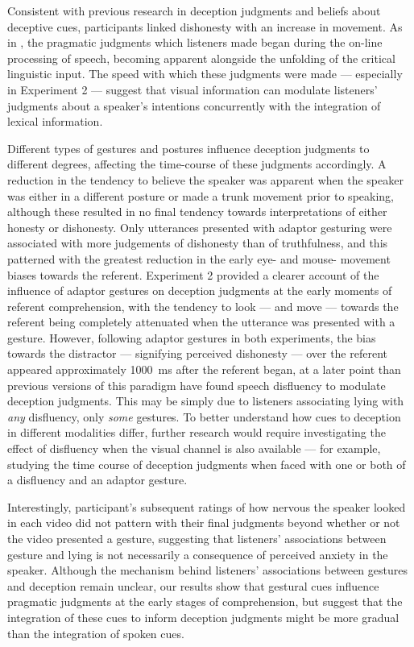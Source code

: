 \documentclass[a4paper,man,natbib]{apa6}
\begin{document}
Consistent with previous research in deception judgments and beliefs about deceptive cues, participants linked dishonesty with an increase in movement. 
As in \citet{Loy2017}, the pragmatic judgments which listeners made began during the on-line processing of speech, becoming apparent alongside the unfolding of the critical linguistic input.
The speed with which these judgments were made --- especially in Experiment 2 --- suggest that visual information can modulate listeners' judgments about a speaker's intentions concurrently with the integration of lexical information.

Different types of gestures and postures influence deception judgments to different degrees, affecting the time-course of these judgments accordingly. 
A reduction in the tendency to believe the speaker was apparent when the speaker was either in a different posture or made a trunk movement prior to speaking, although these resulted in no final tendency towards interpretations of either honesty or dishonesty. 
Only utterances presented with adaptor gesturing were associated with more judgements of dishonesty than of truthfulness, and this patterned with the greatest reduction in the early eye- and mouse- movement biases towards the referent. 
Experiment 2 provided a clearer account of the influence of adaptor gestures on deception judgments at the early moments of referent comprehension, with the tendency to look --- and move --- towards the referent being completely attenuated when the utterance was presented with a gesture. 
However, following adaptor gestures in both experiments, the bias towards the distractor --- signifying perceived dishonesty --- over the referent appeared approximately 1000~ms after the referent began, at a later point than previous versions of this paradigm have found speech disfluency to modulate deception judgments.
This may be simply due to listeners associating lying with \textit{any} disfluency, only \textit{some} gestures.
To better understand how cues to deception in different modalities differ, further research would require investigating the effect of disfluency when the visual channel is also available --- for example, studying the time course of deception judgments when faced with one or both of a disfluency and an adaptor gesture. %

Interestingly, participant's subsequent ratings of how nervous the speaker looked in each video did not pattern with their final judgments beyond whether or not the video presented a gesture, suggesting that listeners' associations between gesture and lying is not necessarily a consequence of perceived anxiety in the speaker.
Although the mechanism behind listeners' associations between gestures and deception remain unclear, our results show that gestural cues influence pragmatic judgments at the early stages of comprehension, but suggest that the integration of these cues to inform deception judgments might be more gradual than the integration of spoken cues.




\end{document}
